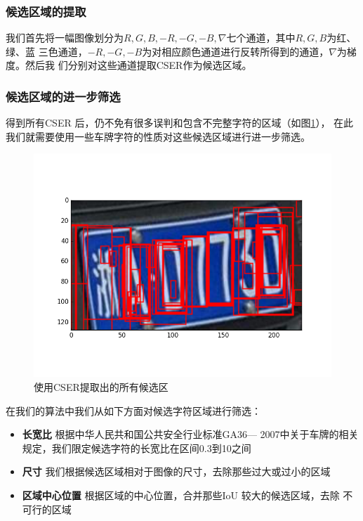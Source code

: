 \subsubsection{候选区域的提取}

我们首先将一幅图像划分为$R,G,B,-R,-G,-B,\nabla$七个通道，其中$R,G,B$为红、绿、蓝
三色通道，$-R,-G,-B$为对相应颜色通道进行反转所得到的通道，$\nabla$为梯度。然后我
们分别对这些通道提取CSER作为候选区域。

\subsubsection{候选区域的进一步筛选}

得到所有CSER 后，仍不免有很多误判和包含不完整字符的区域（如图\ref{Fig:AllERs}），
在此我们就需要使用一些车牌字符的性质对这些候选区域进行进一步筛选。

\begin{figure}[ht]
  \centering
  \includegraphics[width=0.8\linewidth]{./Figure/AllERs.png}
  \caption{使用CSER提取出的所有候选区}\label{Fig:AllERs}
\end{figure}

在我们的算法中我们从如下方面对候选字符区域进行筛选：

\begin{itemize}
\item \textbf{长宽比} 根据中华人民共和国公共安全行业标准GA36— 2007中关于车牌的相关
  规定，我们限定候选字符的长宽比在区间0.3到10之间
\item \textbf{尺寸} 我们根据候选区域相对于图像的尺寸，去除那些过大或过小的区域
\item \textbf{区域中心位置} 根据区域的中心位置，合并那些IoU 较大的候选区域，去除
  不可行的区域
\end{itemize} 

